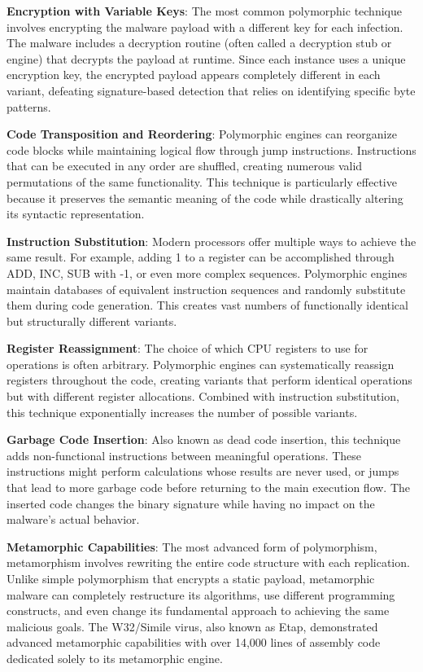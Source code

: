 \textbf{Encryption with Variable Keys}: The most common polymorphic technique involves encrypting the malware payload with a different key for each infection. The malware includes a decryption routine (often called a decryption stub or engine) that decrypts the payload at runtime. Since each instance uses a unique encryption key, the encrypted payload appears completely different in each variant, defeating signature-based detection that relies on identifying specific byte patterns.

\textbf{Code Transposition and Reordering}: Polymorphic engines can reorganize code blocks while maintaining logical flow through jump instructions. Instructions that can be executed in any order are shuffled, creating numerous valid permutations of the same functionality. This technique is particularly effective because it preserves the semantic meaning of the code while drastically altering its syntactic representation.

\textbf{Instruction Substitution}: Modern processors offer multiple ways to achieve the same result. For example, adding 1 to a register can be accomplished through ADD, INC, SUB with -1, or even more complex sequences. Polymorphic engines maintain databases of equivalent instruction sequences and randomly substitute them during code generation. This creates vast numbers of functionally identical but structurally different variants.

\textbf{Register Reassignment}: The choice of which CPU registers to use for operations is often arbitrary. Polymorphic engines can systematically reassign registers throughout the code, creating variants that perform identical operations but with different register allocations. Combined with instruction substitution, this technique exponentially increases the number of possible variants.

\textbf{Garbage Code Insertion}: Also known as dead code insertion, this technique adds non-functional instructions between meaningful operations. These instructions might perform calculations whose results are never used, or jumps that lead to more garbage code before returning to the main execution flow. The inserted code changes the binary signature while having no impact on the malware's actual behavior.

\textbf{Metamorphic Capabilities}: The most advanced form of polymorphism, metamorphism involves rewriting the entire code structure with each replication. Unlike simple polymorphism that encrypts a static payload, metamorphic malware can completely restructure its algorithms, use different programming constructs, and even change its fundamental approach to achieving the same malicious goals. The W32/Simile virus, also known as Etap, demonstrated advanced metamorphic capabilities with over 14,000 lines of assembly code dedicated solely to its metamorphic engine.


